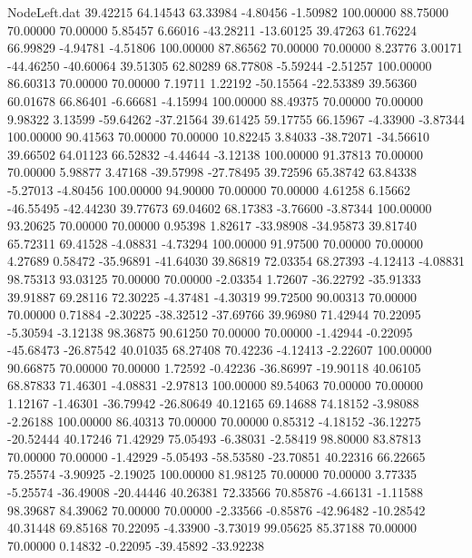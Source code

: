 \begin{filecontents}{NodeLeft.dat}
  39.42215   64.14543   63.33984    -4.80456   -1.50982  100.00000   88.75000   70.00000   70.00000    5.85457    6.66016  -43.28211  -13.60125
  39.47263   61.76224   66.99829    -4.94781   -4.51806  100.00000   87.86562   70.00000   70.00000    8.23776    3.00171  -44.46250  -40.60064
  39.51305   62.80289   68.77808    -5.59244   -2.51257  100.00000   86.60313   70.00000   70.00000    7.19711    1.22192  -50.15564  -22.53389
  39.56360   60.01678   66.86401    -6.66681   -4.15994  100.00000   88.49375   70.00000   70.00000    9.98322    3.13599  -59.64262  -37.21564
  39.61425   59.17755   66.15967    -4.33900   -3.87344  100.00000   90.41563   70.00000   70.00000   10.82245    3.84033  -38.72071  -34.56610
  39.66502   64.01123   66.52832    -4.44644   -3.12138  100.00000   91.37813   70.00000   70.00000    5.98877    3.47168  -39.57998  -27.78495
  39.72596   65.38742   63.84338    -5.27013   -4.80456  100.00000   94.90000   70.00000   70.00000    4.61258    6.15662  -46.55495  -42.44230
  39.77673   69.04602   68.17383    -3.76600   -3.87344  100.00000   93.20625   70.00000   70.00000    0.95398    1.82617  -33.98908  -34.95873
  39.81740   65.72311   69.41528    -4.08831   -4.73294  100.00000   91.97500   70.00000   70.00000    4.27689    0.58472  -35.96891  -41.64030
  39.86819   72.03354   68.27393    -4.12413   -4.08831   98.75313   93.03125   70.00000   70.00000   -2.03354    1.72607  -36.22792  -35.91333
  39.91887   69.28116   72.30225    -4.37481   -4.30319   99.72500   90.00313   70.00000   70.00000    0.71884   -2.30225  -38.32512  -37.69766
  39.96980   71.42944   70.22095    -5.30594   -3.12138   98.36875   90.61250   70.00000   70.00000   -1.42944   -0.22095  -45.68473  -26.87542
  40.01035   68.27408   70.42236    -4.12413   -2.22607  100.00000   90.66875   70.00000   70.00000    1.72592   -0.42236  -36.86997  -19.90118
  40.06105   68.87833   71.46301    -4.08831   -2.97813  100.00000   89.54063   70.00000   70.00000    1.12167   -1.46301  -36.79942  -26.80649
  40.12165   69.14688   74.18152    -3.98088   -2.26188  100.00000   86.40313   70.00000   70.00000    0.85312   -4.18152  -36.12275  -20.52444
  40.17246   71.42929   75.05493    -6.38031   -2.58419   98.80000   83.87813   70.00000   70.00000   -1.42929   -5.05493  -58.53580  -23.70851
  40.22316   66.22665   75.25574    -3.90925   -2.19025  100.00000   81.98125   70.00000   70.00000    3.77335   -5.25574  -36.49008  -20.44446
  40.26381   72.33566   70.85876    -4.66131   -1.11588   98.39687   84.39062   70.00000   70.00000   -2.33566   -0.85876  -42.96482  -10.28542
  40.31448   69.85168   70.22095    -4.33900   -3.73019   99.05625   85.37188   70.00000   70.00000    0.14832   -0.22095  -39.45892  -33.92238

\end{filecontents}
